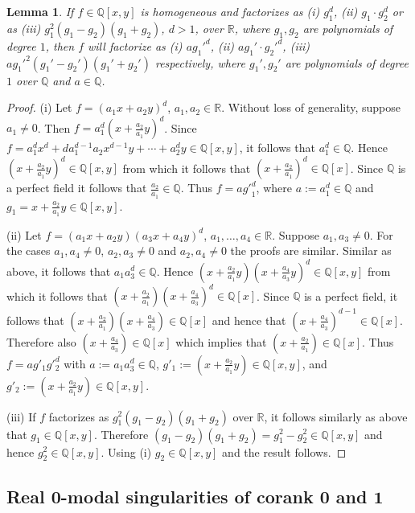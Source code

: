 \documentclass[noend]{amsproc}
\newtheorem{lemma}[theorem]{Lemma}
\begin{document}
\begin{lemma}\label{x^3}
If $f\in\mathbb Q[x,y]$ is homogeneous and factorizes as (i) $g_1^d$, (ii)
$g_1\cdot g_2^{d}$ or as  (iii) $g_1^2(g_1-g_2)(g_1+g_2)$, $d>1$, over
$\mathbb
R$, where $g_1,g_2$ are polynomials of degree $1$, then $f$ will factorize as
(i) $ag_1'^d$, (ii) $ag_1'\cdot g_2'^d$, (iii) $ag_1'^2(g_1'-g_2')(g_1'+g_2')$
respectively,
where $g_1', g_2'$ are polynomials of degree $1$ over $\mathbb Q$ and
$a\in\mathbb Q$.
\end{lemma}
\begin{proof}

(i) Let $f=(a_1x+a_2y)^d$, $a_1,a_2\in\mathbb R$. Without loss of generality,
suppose $a_1\neq 0$. Then $f=a_1^d(x+\frac{a_2}{a_1}y)^d$. Since $f=
a_1^dx^d+da_1^{d-1}a_2x^{d-1}y+\cdots+a_2^dy\in\mathbb Q[x,y]$, it follows
that $a_1^d\in\mathbb Q$. Hence $(x+\frac{a_2}{a_1}y)^d\in\mathbb Q[x,y]$
from which it follows that $(x+\frac{a_2}{a_1})^d\in\mathbb Q[x]$. Since
$\mathbb Q$ is a perfect field it follows that $\frac{a_2}{a_1}\in\mathbb
Q$. Thus $f=a{g'}_1^d$, where $a:=a_1^d\in\mathbb Q$ and
$g_1=x+\frac{a_2}{a_1}y\in\mathbb Q[x,y]$.

(ii) Let $f=(a_1x+a_2y)(a_3x+a_4y)^{d}$, $a_1,\ldots,a_4\in\mathbb
R$. Suppose $a_1,a_3\neq 0$.
For the cases $a_1,a_4\neq 0$, $a_2,a_3\neq 0$ and $a_2,a_4\neq 0$ the
proofs are similar.
Similar as above, it follows that $a_1a_3^{d}\in\mathbb Q$. Hence
$(x+\frac{a_2}{a_1}y)(x+\frac{a_4}{a_3}y)^d\in\mathbb Q[x,y]$ from which
it follows that $(x+\frac{a_2}{a_1})(x+\frac{a_4}{a_3})^d\in\mathbb
Q[x]$. Since $\mathbb Q$ is a perfect field, it follows that
$(x+\frac{a_2}{a_1})(x+\frac{a_4}{a_3})\in\mathbb Q[x]$ and
hence that $(x+\frac{a_4}{a_3})^{d-1}\in\mathbb Q[x]$. Therefore
also $(x+\frac{a_4}{a_3})\in\mathbb Q[x]$ which implies that
$(x+\frac{a_2}{a_1})\in\mathbb Q[x]$.
Thus $f=ag'_1g'^d_2$ with $a:=a_1a_3^d\in\mathbb Q$,
$g'_1:=(x+\frac{a_2}{a_1}y)\in\mathbb Q[x,y]$, and
$g'_2:=(x+\frac{a_2}{a_1}y)\in\mathbb Q[x,y]$.

(iii) If $f$ factorizes as $g_1^2(g_1-g_2)(g_1+g_2)$ over $\mathbb R$, it
follows similarly as above that $g_1\in\mathbb Q[x,y]$. Therefore
$(g_1-g_2)(g_1+g_2)=g_1^2-g_2^2\in\mathbb Q[x,y]$ and hence $g_2^2\in\mathbb
Q[x,y]$. Using (i) $g_2\in\mathbb Q[x,y]$ and the result follows.
\end{proof}

\subsection{Real $\mathbf{0}$-modal singularities of corank $\mathbf{0}$ and
$\mathbf{1}$}%
\label{RealSingularitiesOfZeroModality}
\end{document}

